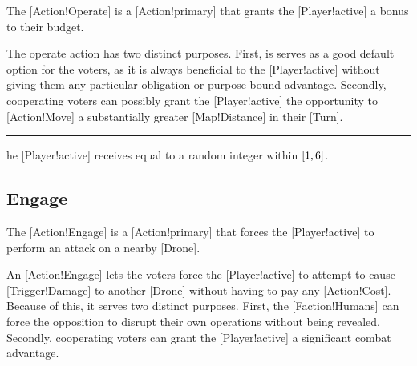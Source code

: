 The [Action!Operate] is a [Action!primary] that grants the [Player!active] a bonus to their \AP{} budget.

The operate action has two distinct purposes.
First, is serves as a good default option for the voters, as it is always beneficial to the [Player!active] without giving them any particular obligation or purpose-bound advantage.
Secondly, cooperating voters can possibly grant the [Player!active] the opportunity to [Action!Move] a substantially greater [Map!Distance] in their [Turn].

\begin{rules}
    \rule{action.operate} The [Player!active] receives \AP{} equal to a random integer within \(\interval{1}{6}\).
\end{rules}

\subsection{Engage}

The [Action!Engage] is a [Action!primary] that forces the [Player!active] to perform an attack on a nearby [Drone].

An [Action!Engage] lets the voters force the [Player!active] to attempt to cause [Trigger!Damage] to another [Drone] without having to pay any [Action!Cost].
Because of this, it serves two distinct purposes.
First, the [Faction!Humans] can force the opposition to disrupt their own operations without being revealed.
Secondly, cooperating voters can grant the [Player!active] a significant combat advantage.


